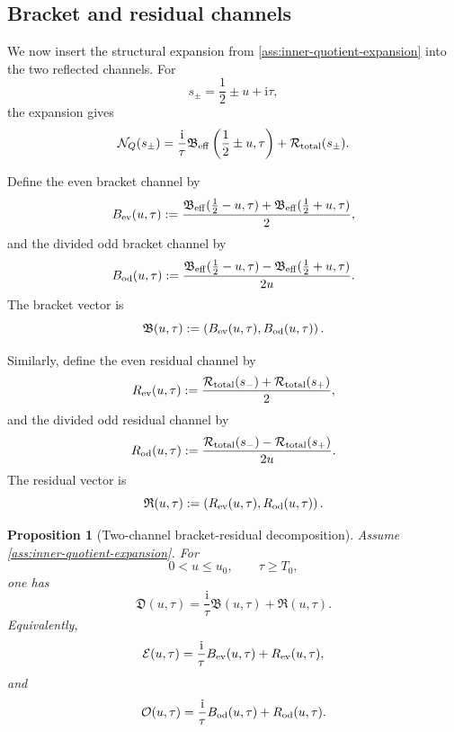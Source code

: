 \documentclass[11pt]{article}
\newtheorem{proposition}[theorem]{Proposition}
\newcommand{\ii}{\mathrm{i}}
\newcommand{\NQ}{\mathcal N_Q}
\newcommand{\Rtot}{\mathcal R_{\rm total}}
\newcommand{\Beff}{\mathfrak B_{\rm eff}}
\newcommand{\Ech}{\mathcal E}
\newcommand{\Och}{\mathcal O}
\newcommand{\Dvec}{\mathfrak D}
\newcommand{\Bvec}{\mathfrak B}
\newcommand{\Rvec}{\mathfrak R}
\begin{document}
\subsection{Bracket and residual channels}

We now insert the structural expansion from
\cref{ass:inner-quotient-expansion} into the two reflected channels.  For
\[
        s_\pm=\frac12\pm u+\ii\tau,
\]
the expansion gives
\[
        \NQ(s_\pm)
        =
        \frac{\ii}{\tau}
        \Beff\left(\frac12\pm u,\tau\right)
        +
        \Rtot(s_\pm).
\]

Define the even bracket channel by
\[
        B_{\rm ev}(u,\tau)
        :=
        \frac{
        \Beff(\frac12-u,\tau)
        +
        \Beff(\frac12+u,\tau)
        }{2},
\]
and the divided odd bracket channel by
\[
        B_{\rm od}(u,\tau)
        :=
        \frac{
        \Beff(\frac12-u,\tau)
        -
        \Beff(\frac12+u,\tau)
        }{2u}.
\]
The bracket vector is
\[
        \Bvec(u,\tau)
        :=
        \left(
        B_{\rm ev}(u,\tau),
        B_{\rm od}(u,\tau)
        \right).
\]

Similarly, define the even residual channel by
\[
        R_{\rm ev}(u,\tau)
        :=
        \frac{
        \Rtot(s_-)
        +
        \Rtot(s_+)
        }{2},
\]
and the divided odd residual channel by
\[
        R_{\rm od}(u,\tau)
        :=
        \frac{
        \Rtot(s_-)
        -
        \Rtot(s_+)
        }{2u}.
\]
The residual vector is
\[
        \Rvec(u,\tau)
        :=
        \left(
        R_{\rm ev}(u,\tau),
        R_{\rm od}(u,\tau)
        \right).
\]

\begin{proposition}[Two-channel bracket-residual decomposition]
\label{prop:two-channel-decomposition}
Assume \cref{ass:inner-quotient-expansion}.  For
\[
        0<u\le u_0,
        \qquad
        \tau\ge T_0,
\]
one has
\[
        \Dvec(u,\tau)
        =
        \frac{\ii}{\tau}
        \Bvec(u,\tau)
        +
        \Rvec(u,\tau).
\]
Equivalently,
\[
        \Ech(u,\tau)
        =
        \frac{\ii}{\tau}
        B_{\rm ev}(u,\tau)
        +
        R_{\rm ev}(u,\tau),
\]
and
\[
        \Och(u,\tau)
        =
        \frac{\ii}{\tau}
        B_{\rm od}(u,\tau)
        +
        R_{\rm od}(u,\tau).
\]
\end{proposition}
\end{document}
